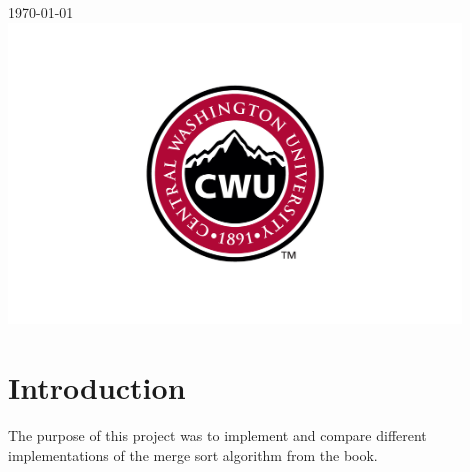 \documentclass[12pt]{article}
\begin{document}
\begin{titlepage}
		
		
		{\large \today}\\ %
		
		
		\includegraphics[width=12cm]{CWU-Logo.png}\\[.5cm] %
		
		
		\vfill %
		
	\end{titlepage}
	\newpage
	\tableofcontents
	\newpage
	
	
	
	\section{Introduction}
		The purpose of this project was to implement and compare different implementations of the merge sort algorithm from the book.
		
\end{document}
